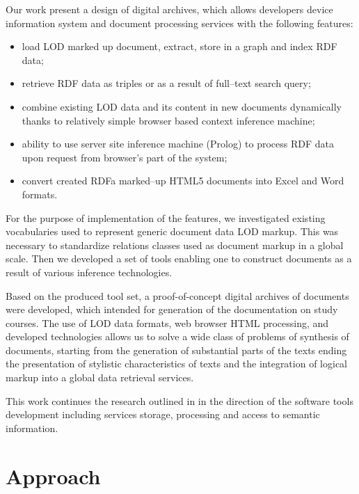 \documentclass[conference,a4paper]{IEEEtran}
\begin{document}
Our work present a design of digital archives, which allows
developers device information system and document processing services
with the following features:
\begin{itemize}
\item load LOD marked up document, extract, store in a graph and index RDF data;
\item retrieve RDF data as triples or as a result of full--text search query;
\item combine existing LOD data and its content in new documents dynamically
  thanks to relatively simple browser based context inference machine;
\item ability to use server site inference machine (Prolog) to process RDF data upon
  request from browser's part of the system;
\item convert created RDFa marked--up HTML5 documents into Excel and Word formats.
\end{itemize}

For the purpose of implementation of the features, we investigated existing
vocabularies used to represent generic document data LOD markup.  This was necessary to standardize relations classes used as document markup in a global scale.  Then we developed a set of tools enabling one to construct documents as a result of various inference technologies.

Based on the produced tool set, a proof-of-concept digital archives of documents were developed, which intended for generation of the documentation on study courses.  The use of LOD data formats, web browser HTML processing, and developed technologies allows us to solve a wide class of problems of synthesis of documents, starting from the generation of substantial parts of the texts ending the presentation of stylistic characteristics of texts and the integration of logical markup into a global data retrieval services.

This work continues the research outlined in \cite{b2} in the direction of the software tools development including services storage, processing and access to semantic information.

\section{Approach}
\end{document}
